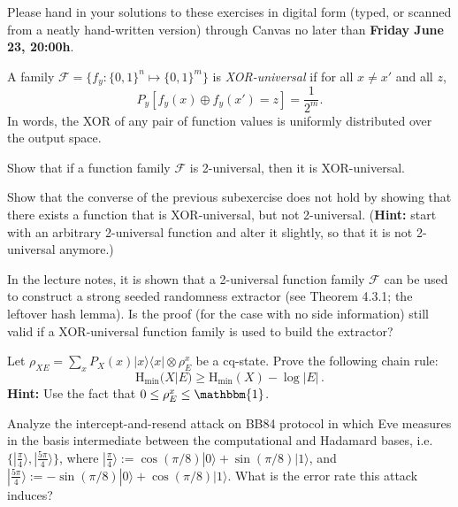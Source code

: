 \documentclass[a4paper,10pt,landscape,twocolumn]{scrartcl}
\newcommand{\ket}[1]{| #1 \rangle}
\newcommand{\bra}[1]{\langle #1 |}
\newcommand\deadline{Friday June 23, 20:00h}
\begin{document}
\newcommand{\Hmin}{\mathrm{H}_{\mathrm{min}}}

\homeworkproblems

{\sffamily\noindent
Please hand in your solutions to these exercises in digital form (typed, or scanned from a neatly hand-written version) through Canvas no later than \textbf{\deadline}.  %
}


\begin{exercise}
A family $\mathscr{F} = \{f_y : \{0,1\}^n \mapsto \{0,1\}^m\}$ is \emph{XOR-universal} if for all $x \neq x'$ and all $z$,
\[
P_y[f_y(x) \oplus f_y(x') = z] = \frac{1}{2^m}.
\]
	In words, the XOR of any pair of function values is uniformly distributed over the output space.
	\begin{subex}
		Show that if a function family $\mathscr{F}$ is 2-universal, then it is XOR-universal.
	\end{subex}
    \begin{subex}
        Show that the converse of the previous subexercise does not hold by showing that there exists a function that is XOR-universal, but not 2-universal. (\textbf{Hint:} start with an arbitrary 2-universal function and alter it slightly, so that it is not 2-universal anymore.)
    \end{subex}
    \begin{subex}
    	In the lecture notes, it is shown that a 2-universal function family $\mathscr{F}$ can be used to construct a strong seeded randomness extractor (see Theorem 4.3.1; the leftover hash lemma). Is the proof (for the case with no side information) still valid if a XOR-universal function family is used to build the extractor?
    \end{subex}
\end{exercise}

\begin{exercise}
Let $\rho_{XE} = \sum_x P_X(x) \ket{x}\bra{x} \otimes \rho_E^x$ be a cq-state. Prove the following chain rule:
\[
\Hmin(X | E) \geq \Hmin(X) - \log |E| \, .
\]
\textbf{Hint: } Use the fact that $0 \leq \rho_E^x \leq \mathbbm{1}$.

\end{exercise}

\begin{exercise}
Analyze the intercept-and-resend attack on BB84 protocol in which Eve measures in the basis intermediate between the computational and Hadamard bases, i.e. $\{\ket{\frac{\pi}{4}},\ket{\frac{5\pi}{4}} \}$, where $\ket{\frac{\pi}{4}}:=\cos(\pi/8)\ket{0}+\sin(\pi/8)\ket{1}$, and $\ket{\frac{5\pi}{4}}:=-\sin(\pi/8)\ket{0}+\cos(\pi/8)\ket{1}$. What is the error rate this attack induces?
\end{exercise}
\end{document}

